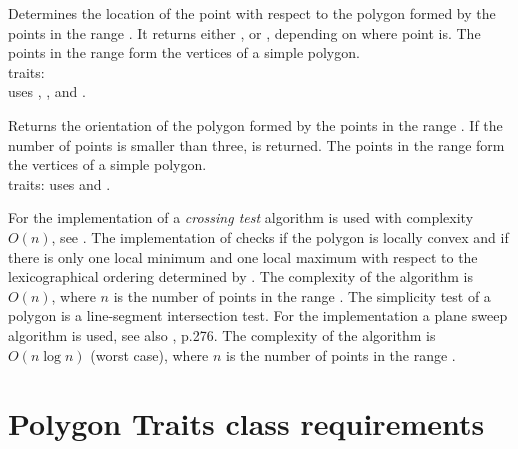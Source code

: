 {
Determines the location of the point  with respect to the polygon
formed by the points in the range \ccStyle{[first,last)}.
It returns either , 
or , depending on where point  is.
\ccPrecond The points in the range \ccStyle{[first,last)}
form the vertices of a simple polygon.\\
{\sc traits}: \\ uses ,
                   ,
                    and
                   .
}

{\samepage
{}
{
Returns the orientation of the polygon formed by the points in the range
\ccStyle{[first,last)}. 
If the number of points is smaller than three,  is
returned.
\ccPrecond The points in the range \ccStyle{[first,last)}
form the vertices of a simple polygon.\\
{\sc traits}: uses  and .
}
}

\ccImplementation
For the implementation of  
a {\em crossing test} algorithm is used with complexity
$O(n)$, see \cite{h-pps-94}.
The implementation of  checks if the polygon is locally convex
and if there is only one local minimum and one local maximum with respect to
the lexicographical ordering determined by
.
The complexity of the algorithm is $O(n)$, where $n$ is the number of points
in the range \ccStyle{[first,last)}.
The simplicity test  of a polygon is a line-segment 
intersection test. For the implementation a plane sweep algorithm is used, see also 
\cite{ps-cgi-85}, p.276.
The complexity of the algorithm is $O(n \log n)$ (worst case), where $n$ is 
the number of points in the range \ccStyle{[first,last)}.


\section{Polygon Traits class requirements}

